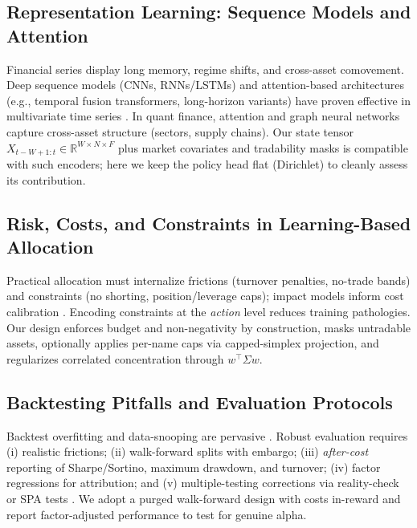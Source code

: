 \documentclass[10pt,leqno]{amsart}
\begin{document}
\subsection{Representation Learning: Sequence Models and Attention}
Financial series display long memory, regime shifts, and cross-asset comovement. Deep sequence models (CNNs, RNNs/LSTMs) and attention-based architectures (e.g., temporal fusion transformers, long-horizon variants) have proven effective in multivariate time series \cite{lim2021temporal,zhou2021informer}. In quant finance, attention and graph neural networks capture cross-asset structure (sectors, supply chains). Our state tensor $X_{t-W+1:t}\in\mathbb{R}^{W\times N\times F}$ plus market covariates and tradability masks is compatible with such encoders; here we keep the policy head flat (Dirichlet) to cleanly assess its contribution.

\subsection{Risk, Costs, and Constraints in Learning-Based Allocation}
Practical allocation must internalize frictions (turnover penalties, no-trade bands) and constraints (no shorting, position/leverage caps); impact models inform cost calibration \cite{almgren2000optimal}. Encoding constraints at the \emph{action} level reduces training pathologies. Our design enforces budget and non-negativity by construction, masks untradable assets, optionally applies per-name caps via capped-simplex projection, and regularizes correlated concentration through $w^\top \Sigma w$.

\subsection{Backtesting Pitfalls and Evaluation Protocols}
Backtest overfitting and data-snooping are pervasive \cite{bailey2014backtest,bailey2016deflated,harvey2016and}. Robust evaluation requires (i) realistic frictions; (ii) walk-forward splits with embargo; (iii) \emph{after-cost} reporting of Sharpe/Sortino, maximum drawdown, and turnover; (iv) factor regressions for attribution; and (v) multiple-testing corrections via reality-check or SPA tests \cite{white2000reality,romano2005stepwise}. We adopt a purged walk-forward design with costs in-reward and report factor-adjusted performance to test for genuine alpha.
\end{document}
